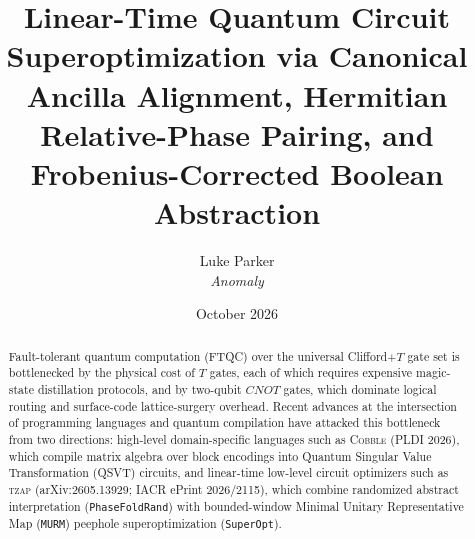 \documentclass[11pt,a4paper]{article}
\title{\textbf{Linear-Time Quantum Circuit Superoptimization via Canonical Ancilla Alignment, Hermitian Relative-Phase Pairing, and Frobenius-Corrected Boolean Abstraction}}
\author{Luke Parker \\ \textit{Anomaly}}
\date{October 2026}
\theoremstyle{definition}
\begin{document}
\maketitle

\begin{abstract}
Fault-tolerant quantum computation (FTQC) over the universal Clifford+$T$ gate set is bottlenecked by the physical cost of $T$ gates, each of which requires expensive magic-state distillation protocols, and by two-qubit $\mathit{CNOT}$ gates, which dominate logical routing and surface-code lattice-surgery overhead. Recent advances at the intersection of programming languages and quantum compilation have attacked this bottleneck from two directions: high-level domain-specific languages such as \textsc{Cobble} (PLDI 2026), which compile matrix algebra over block encodings into Quantum Singular Value Transformation (QSVT) circuits, and linear-time low-level circuit optimizers such as \textsc{tzap} (arXiv:2605.13929; IACR ePrint 2026/2115), which combine randomized abstract interpretation (\texttt{PhaseFoldRand}) with bounded-window Minimal Unitary Representative Map (\texttt{MURM}) peephole superoptimization (\texttt{SuperOpt}).


\end{abstract}
\end{document}
